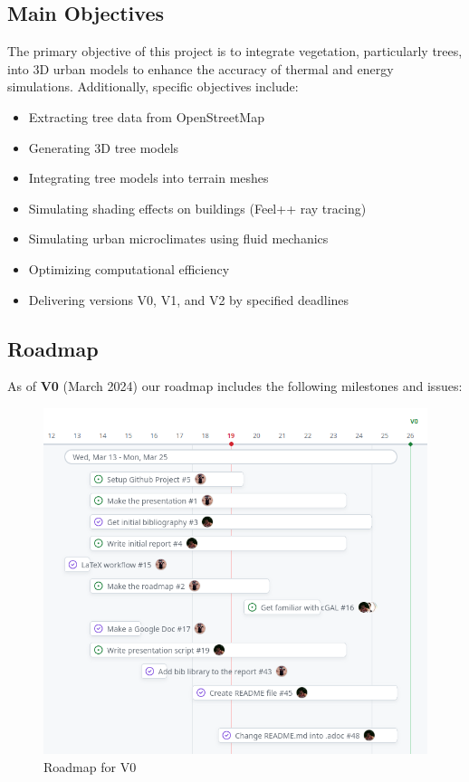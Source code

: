 \documentclass[12pt]{article}
\begin{document}
\subsection{Main Objectives}
The primary objective of this project is to integrate vegetation, particularly 
trees, into 3D urban models to enhance the accuracy of thermal and energy simulations. 
Additionally, specific objectives include:
\begin{itemize}
    \item Extracting tree data from OpenStreetMap
    \item Generating 3D tree models
    \item Integrating tree models into terrain meshes
    \item Simulating shading effects on buildings (Feel++ ray tracing)
    \item Simulating urban microclimates using fluid mechanics
    \item Optimizing computational efficiency
    \item Delivering versions V0, V1, and V2 by specified deadlines
\end{itemize}

\subsection{Roadmap}
As of \textbf{V0} (March 2024) our roadmap includes the following milestones and issues:  
\begin{figure}[H]
    \centering
    \includegraphics[width=1\textwidth]{images/roadmap_v0.png}
    \caption{Roadmap for V0}
\end{figure}
\end{document}
